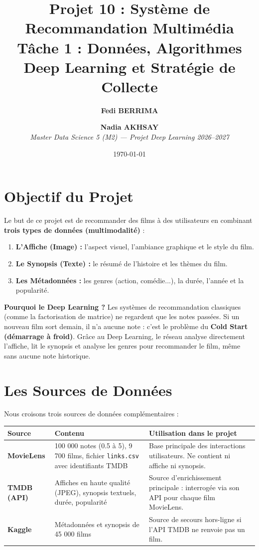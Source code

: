 \documentclass[10pt,a4paper]{article}
\title{\vspace{-1.2cm}\textbf{\Large Projet 10 : Système de Recommandation Multimédia}\\
\large Tâche 1 : Données, Algorithmes Deep Learning et Stratégie de Collecte}
\author{\textbf{Fedi BERRIMA} \and \textbf{Nadia AKHSAY}\\
\textit{Master Data Science 5 (M2) --- Projet Deep Learning 2026--2027}}
\date{\vspace{-0.5cm}\today}
\begin{document}
\maketitle

\section{Objectif du Projet}
Le but de ce projet est de recommander des films à des utilisateurs en combinant \textbf{trois types de données (multimodalité)} :
\begin{enumerate}
    \item \textbf{L'Affiche (Image) :} l'aspect visuel, l'ambiance graphique et le style du film.
    \item \textbf{Le Synopsis (Texte) :} le résumé de l'histoire et les thèmes du film.
    \item \textbf{Les Métadonnées :} les genres (action, comédie...), la durée, l'année et la popularité.
\end{enumerate}

\textbf{Pourquoi le Deep Learning ?} Les systèmes de recommandation classiques (comme la factorisation de matrice) ne regardent que les notes passées. Si un nouveau film sort demain, il n'a aucune note : c'est le problème du \textbf{Cold Start (démarrage à froid)}. Grâce au Deep Learning, le réseau analyse directement l'affiche, lit le synopsis et analyse les genres pour recommander le film, même sans aucune note historique.

\section{Les Sources de Données}
Nous croisons trois sources de données complémentaires :

\begin{table}[h]
\centering
\small
\begin{tabular}{@{}lp{5.5cm}p{7cm}@{}}
\toprule
\textbf{Source} & \textbf{Contenu} & \textbf{Utilisation dans le projet} \\ \midrule
\textbf{MovieLens} & 100 000 notes (0.5 à 5), 9 700 films, fichier \texttt{links.csv} avec identifiants TMDB & Base principale des interactions utilisateurs. Ne contient ni affiche ni synopsis. \\
\textbf{TMDB (API)} & Affiches en haute qualité (JPEG), synopsis textuels, durée, popularité & Source d'enrichissement principale : interrogée via son API pour chaque film MovieLens. \\
\textbf{Kaggle} & Métadonnées et synopsis de 45 000 films & Source de secours hors-ligne si l'API TMDB ne renvoie pas un film. \\ \bottomrule
\end{tabular}
\end{table}
\end{document}
